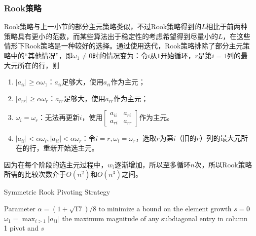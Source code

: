 \documentclass[a4paper,10pt]{ctexart}
\begin{document}
\subsubsection{Rook策略}
Rook策略与上一小节的部分主元策略类似，不过Rook策略得到的$ L $相比于前两种策略具有更小的范数，而某些算法出于稳定性的考虑希望得到尽量小的$ L $，在这些情形下Rook策略是一种较好的选择。通过使用迭代，Rook策略排除了部分主元策略中的“其他情况”，即$ \omega_1\ne 0 $时的情况变为：令$ i $从$ 1 $开始循环，$ r $是第$ i=1 $列的最大元所在的行，则
\begin{enumerate}
    \item $ |a_{ii}|\geqslant \alpha \omega_1 $：$ a_{ii} $足够大，使用$ a_{ii} $作为主元；
    \item $ |a_{rr}|\geqslant \alpha \omega_r $：$ a_{rr} $足够大，使用$ a_{rr} $作为主元；
    \item $ \omega_i = \omega_r $：无法再更新$ i $，使用$ \begin{bmatrix} 
        a_{ii} & a_{ri} \\ a_{ri} & a_{rr}\end{bmatrix}  $作为主元。
    \item $ |a_{ii}|< \alpha \omega_i ,|a_{ii}|< \alpha \omega_r $：令$ i=r,\omega_i=\omega_r $，选取$ r $为第$ i $（旧的$ r $）列的最大元所在的行，重新开始选主元。
\end{enumerate}
因为在每个阶段的选主元过程中，$ w_i $逐渐增加，所以至多循环$ n $次，所以Rook策略所需的比较次数介于$ O(n^2) $和$ O(n^3) $之间。
\begin{algorithm}[htbp]
    \caption{Symmetric Rook Pivoting Strategy}\label{alg:LDLRP}
    Parameter $ \alpha = (1+\sqrt{17}) / 8 $ to minimize a bound on the element growth\;
    $ s=0 $\;
    $ \omega_1 = \max_{i>1}|a_{i1}| $ the maximum magnitude of any subdiagonal entry in column 1\;
    \Return pivot and $ s $\;
\end{algorithm}
\end{document}
